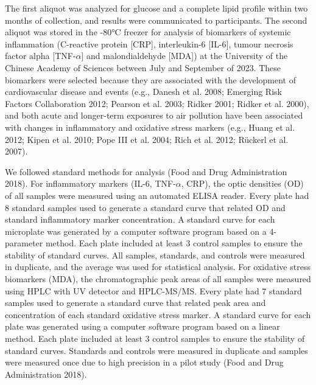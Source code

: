 \documentclass[
  letterpaper,
  DIV=11,
  numbers=noendperiod]{scrartcl}
\providecommand{\DIFaddtex}[1]{{\protect\color{blue}\uwave{#1}}} %
\providecommand{\DIFaddbegin}{} %
\providecommand{\DIFaddend}{} %
\providecommand{\DIFdelbegin}{} %
\providecommand{\DIFdelend}{} %
\providecommand{\DIFadd}[1]{\texorpdfstring{\DIFaddtex{#1}}{#1}} %
\newcommand{\DIFscaledelfig}{0.5}
\newlength{\DIFdelgraphicswidth} %
\newlength{\DIFdelgraphicsheight} %
\newcommand{\DIFaddincludegraphics}[2][]{{\color{blue}\fbox{\DIFOincludegraphics[#1]{#2}}}} %
\newcommand{\DIFdelincludegraphics}[2][]{%
\sbox{\DIFdelgraphicsbox}{\DIFOincludegraphics[#1]{#2}}%
\settoboxwidth{\DIFdelgraphicswidth}{\DIFdelgraphicsbox} %
\settoboxtotalheight{\DIFdelgraphicsheight}{\DIFdelgraphicsbox} %
\scalebox{\DIFscaledelfig}{%
\parbox[b]{\DIFdelgraphicswidth}{\usebox{\DIFdelgraphicsbox}\\[-\baselineskip] \rule{\DIFdelgraphicswidth}{0em}}\llap{\resizebox{\DIFdelgraphicswidth}{\DIFdelgraphicsheight}{%
\setlength{\unitlength}{\DIFdelgraphicswidth}%
\begin{picture}(1,1)%
\thicklines\linethickness{2pt} %
{\color[rgb]{1,0,0}\put(0,0){\framebox(1,1){}}}%
{\color[rgb]{1,0,0}\put(0,0){\line( 1,1){1}}}%
{\color[rgb]{1,0,0}\put(0,1){\line(1,-1){1}}}%
\end{picture}%
}\hspace*{3pt}}} %
} %
\DeclareRobustCommand{\DIFaddbegin}{\DIFOaddbegin \let\includegraphics\DIFaddincludegraphics} %
\DeclareRobustCommand{\DIFaddend}{\DIFOaddend \let\includegraphics\DIFOincludegraphics} %
\DeclareRobustCommand{\DIFdelbegin}{\DIFOdelbegin \let\includegraphics\DIFdelincludegraphics} %
\DeclareRobustCommand{\DIFdelend}{\DIFOaddend \let\includegraphics\DIFOincludegraphics} %
\begin{document}
The first aliquot was analyzed for glucose and a complete lipid profile
within two months of collection, and results were communicated to
participants. The second aliquot was stored in the -80°C freezer for
analysis of biomarkers of systemic inflammation (C-reactive protein
{[}CRP{]}, interleukin-6 {[}IL-6{]}, tumour necrosis factor alpha
{[}TNF-\(\alpha\){]} and malondialdehyde {[}MDA{]}) at the University of
the Chinese Academy of Sciences between July and September of 2023.
These biomarkers were selected because they are associated with the
development of cardiovascular disease and events (e.g., Danesh et al.
2008; Emerging Risk Factors Collaboration 2012; Pearson et al. 2003;
Ridker 2001; Ridker et al. 2000), and both acute and longer-term
exposures to air pollution have been associated with changes in
inflammatory and oxidative stress markers (e.g., Huang et al. 2012;
Kipen et al. 2010; Pope III et al. 2004; Rich et al. 2012; Rückerl et
al. 2007).

We followed standard methods for analysis (Food and Drug Administration
2018). For inflammatory markers (IL-6, TNF-\(\alpha\), CRP), the optic
densities (OD) of all samples were measured using an automated ELISA
reader. Every plate had 8 standard samples used to generate a standard
curve that related OD and standard inflammatory marker concentration. A
standard curve for each microplate was generated by a computer software
program based on a 4-parameter method. Each plate included at least 3
control samples to ensure the stability of standard curves. All samples,
standards, and controls were measured in duplicate, and the average was
used for statistical analysis. For oxidative stress biomarkers (MDA),
the chromatographic peak areas of all samples were measured using HPLC
with UV detector and HPLC-MS/MS. Every plate had 7 standard samples used
to generate a standard curve that related peak area and concentration of
each standard oxidative stress marker. A standard curve for each plate
was generated using a computer software program based on a linear
method. Each plate included at least 3 control samples to ensure the
stability of standard curves. Standards and controls were measured in
duplicate and samples were measured once due to high precision in a
pilot study (Food and Drug Administration 2018).

\DIFdelbegin %
\DIFdelend \DIFaddbegin \subsubsection{\DIFadd{Anthropometric
measurements.}}\label{anthropometric-measurements.}
\DIFaddend 
\end{document}
